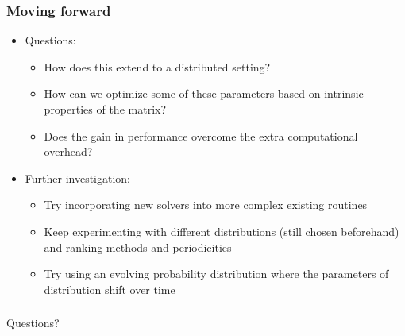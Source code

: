 \documentclass{beamer}
\begin{document}
\begin{frame}
	\frametitle{Moving forward}
	    \begin{itemize}
	        \item Questions:
	            \begin{itemize}
	                \item How does this extend to a distributed setting?
	                \item How can we optimize some of these parameters based on intrinsic properties of the matrix?
	                \item Does the gain in performance overcome the extra computational overhead?
	            \end{itemize}
	        \item Further investigation:
	            \begin{itemize}
            		\item Try incorporating new solvers into more complex existing routines
            		\item Keep experimenting with different distributions (still chosen beforehand) and ranking methods and periodicities
            		\item Try using an evolving probability distribution where the parameters of distribution shift over time 
	            \end{itemize}
	     \end{itemize}       
\end{frame}
 
\begin{frame}
	\frametitle{}
	\begin{center}
	    Questions? 
	\end{center}
\end{frame}

\end{document}
